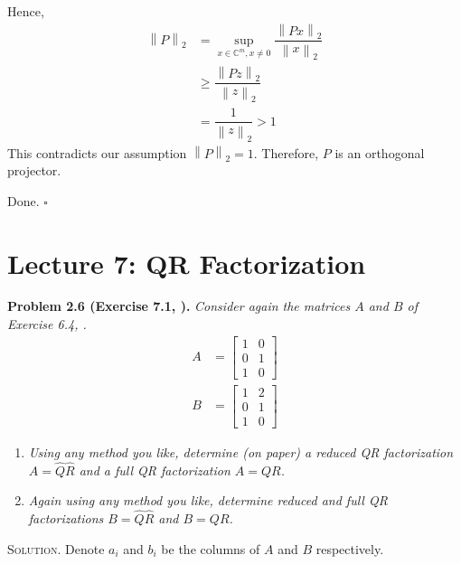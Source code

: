 \documentclass[a4paper,oneside]{book}
\numberwithin{equation}{chapter}
\begin{document}
\begin{enumerate}
Hence, 
\begin{align}
{\left\| P \right\|_2} &= \mathop {\sup }\limits_{x \in {\mathbb{C}^m},x \ne 0} \dfrac{{{{\left\| {Px} \right\|}_2}}}{{{{\left\| x \right\|}_2}}}\\
 &\ge \dfrac{{{{\left\| {Pz} \right\|}_2}}}{{{{\left\| z \right\|}_2}}}\\
 &= \dfrac{1}{{{{\left\| z \right\|}_2}}} > 1
\end{align}
This contradicts our assumption ${\left\| P \right\|_2} = 1$. Therefore, $P$ is an orthogonal projector.
\end{enumerate}
Done.  \hfill $\square$\\
\section{Lecture 7: QR Factorization}
\textbf{Problem 2.6 (Exercise 7.1, \cite{1}).} \textit{Consider again the matrices $A$ and $B$ of Exercise 6.4, \cite{1}.}
\begin{align}
A &= \left[ {\begin{array}{*{20}{c}}
1&0\\
0&1\\
1&0
\end{array}} \right]\\
B &= \left[ {\begin{array}{*{20}{c}}
1&2\\
0&1\\
1&0
\end{array}} \right]
\end{align}
\begin{enumerate}
\item \textit{Using any method you like, determine (on paper) a reduced QR factorization $A = \hat Q\hat R$ and a full QR factorization $A=QR$.}
\item \textit{Again using any method you like, determine reduced and full QR factorizations $B = \hat Q\hat R$ and $B=QR$.}
\end{enumerate}
\textsc{Solution.} Denote $a_i$ and $b_i$ be the columns of $A$ and $B$ respectively.
\end{document}
